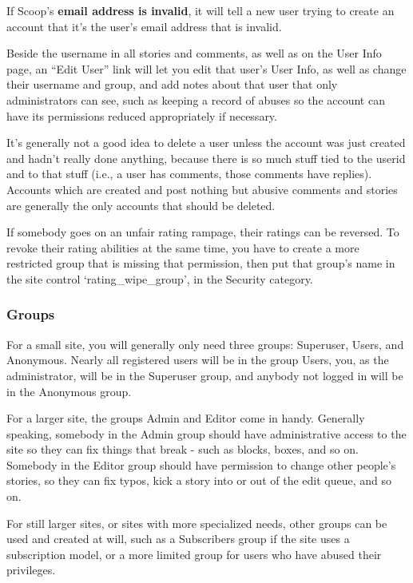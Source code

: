 If Scoop's {\bf email address is invalid}, it will tell a new user trying to create an account that it's the user's email address that is invalid.

Beside the username in all stories and comments, as well as on the User Info page, an ``Edit User'' link will let you edit that user's User Info, as well as change their username and group, and add notes about that user that only administrators can see, such as keeping a record of abuses so the account can have its permissions reduced appropriately if necessary.

It's generally not a good idea to delete a user unless the account was just created and hadn't really done anything, because there is so much stuff tied to the userid and to that stuff (i.e., a user has comments, those comments have replies). Accounts which are created and post nothing but abusive comments and stories are generally the only accounts that should be deleted.

If somebody goes on an unfair rating rampage, their ratings can be reversed.  To revoke their rating abilities at the same time, you have to create a more restricted group that is missing that permission, then put that group's name in the site control `rating\_wipe\_group', in the Security category.

\subsubsection{Groups}
\label{admin-users-groups}

For a small site, you will generally only need three groups: Superuser, Users, and Anonymous.  Nearly all registered users will be in the group Users, you, as the administrator, will be in the Superuser group, and anybody not logged in will be in the Anonymous group.

For a larger site, the groups Admin and Editor come in handy.  Generally speaking, somebody in the Admin group should have administrative access to the site so they can fix things that break - such as blocks, boxes, and so on.  Somebody in the Editor group should have permission to change other people's stories, so they can fix typos, kick a story into or out of the edit queue, and so on.

For still larger sites, or sites with more specialized needs, other groups can be used and created at will, such as a Subscribers group if the site uses a subscription model, or a more limited group for users who have abused their privileges.

